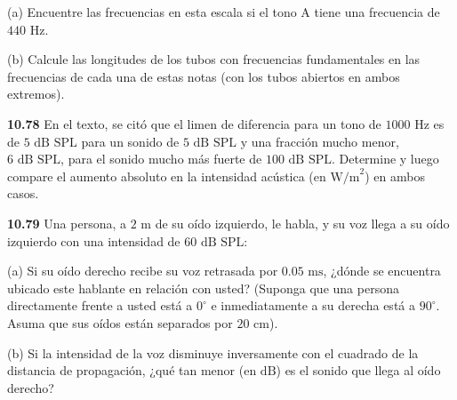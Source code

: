 \documentclass[12pt]{book}
\begin{document}
(a) Encuentre las frecuencias en esta escala si el tono A tiene una frecuencia de $440\text{ Hz}$.

(b) Calcule las longitudes de los tubos con frecuencias fundamentales en las frecuencias de cada una de estas notas (con los tubos abiertos en ambos extremos).

\noindent \textbf{10.78} En el texto, se citó que el limen de diferencia para un tono de $1000\text{ Hz}$ es de $5\text{ dB SPL}$ para un sonido de $5\text{ dB SPL}$ y una fracción mucho menor, $6\text{ dB SPL}$, para el sonido mucho más fuerte de $100\text{ dB SPL}$. Determine y luego compare el aumento absoluto en la intensidad acústica (en $\text{W/m}^2$) en ambos casos.

\noindent \textbf{10.79} Una persona, a $2\text{ m}$ de su oído izquierdo, le habla, y su voz llega a su oído izquierdo con una intensidad de $60\text{ dB SPL}$:

(a) Si su oído derecho recibe su voz retrasada por $0.05\text{ ms}$, ¿dónde se encuentra ubicado este hablante en relación con usted? (Suponga que una persona directamente frente a usted está a $0^\circ$ e inmediatamente a su derecha está a $90^\circ$. Asuma que sus oídos están separados por $20\text{ cm}$).

(b) Si la intensidad de la voz disminuye inversamente con el cuadrado de la distancia de propagación, ¿qué tan menor (en $\text{dB}$) es el sonido que llega al oído derecho?

\end{document}
